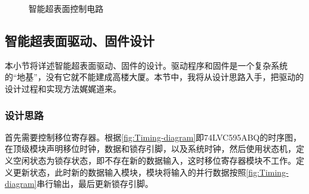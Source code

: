 \documentclass[supercite]{HustGraduPaper}
\begin{document}
\begin{figure}[htb]
	\centering
	\hfil
	\caption{智能超表面控制电路}
	\label{fig:CCB_ALL}
\end{figure}

\subsection{智能超表面驱动、固件设计}

本小节将详述智能超表面驱动、固件的设计。驱动程序和固件是一个复杂系统的“地基”，没有它就不能建成高楼大厦。本节中，我将从设计思路入手，把驱动的设计过程和实现方法娓娓道来。

\subsubsection{设计思路}

首先需要控制移位寄存器。根据\autoref{fig:Timing-diagram}即74LVC595ABQ的时序图，在顶级模块声明移位时钟，数据和锁存引脚，以及系统时钟，然后使用状态机，定义空闲状态为锁存状态，即不存在新的数据输入，这时移位寄存器模块不工作。定义更新状态，此时新的数据输入模块，模块将输入的并行数据按照\autoref{fig:Timing-diagram}串行输出，最后更新锁存引脚。
\end{document}
